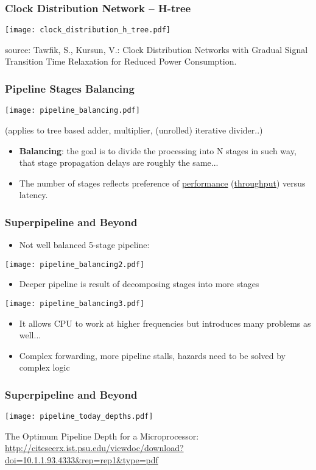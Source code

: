 \documentclass{beamer}
\begin{document}
\begin{frame}
\frametitle{Clock Distribution Network -- H-tree}

{
\centering
\texttt{[image: clock\_distribution\_h\_tree.pdf]}
}

\vskip 2mm

source: Tawfik, S., Kursun, V.: Clock Distribution Networks with Gradual Signal Transition Time Relaxation for Reduced Power Consumption.

\end{frame}

\begin{frame}
\frametitle{Pipeline Stages Balancing}
\texttt{[image: pipeline\_balancing.pdf]}

(applies to tree based adder, multiplier, (unrolled) iterative divider..)

\begin{itemize}
 \item \textbf{Balancing}: the goal is to divide the processing into N stages in such way, that stage propagation delays are roughly the same...
 \item The number of stages reflects preference of \underline{performance} (\underline{throughput}) versus latency.
\end{itemize}

\end{frame}

\begin{frame}
\frametitle{Superpipeline and Beyond}

\begin{itemize}
 \item Not well balanced 5-stage pipeline:
\end{itemize}

\texttt{[image: pipeline\_balancing2.pdf]}

\begin{itemize}
 \item Deeper pipeline is result of decomposing stages into more stages
\end{itemize}

\texttt{[image: pipeline\_balancing3.pdf]}

\begin{itemize}
 \item It allows CPU to work at higher frequencies but introduces many problems as well...
 \item Complex forwarding, more pipeline stalls, hazards need to be solved by complex logic
\end{itemize}

\end{frame}

\begin{frame}
\frametitle{Superpipeline and Beyond}

\texttt{[image: pipeline\_today\_depths.pdf]}

The Optimum Pipeline Depth for a Microprocessor: {\tiny \url{http://citeseerx.ist.psu.edu/viewdoc/download?doi=10.1.1.93.4333&rep=rep1&type=pdf}}

\end{frame}
\end{document}

